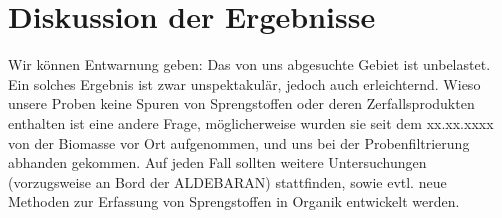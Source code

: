 \section{Diskussion der Ergebnisse}
Wir können Entwarnung geben: Das von uns abgesuchte Gebiet ist unbelastet. Ein
solches Ergebnis ist zwar unspektakulär, jedoch auch erleichternd. Wieso 
unsere Proben keine Spuren von Sprengstoffen oder deren Zerfallsprodukten 
enthalten ist eine andere Frage, möglicherweise wurden sie seit dem xx.xx.xxxx%
von der Biomasse vor Ort aufgenommen, und uns bei der Probenfiltrierung
abhanden gekommen. Auf jeden Fall sollten weitere Untersuchungen (vorzugsweise
an Bord der ALDEBARAN) stattfinden, sowie evtl. neue Methoden zur Erfassung
von Sprengstoffen in Organik entwickelt werden.
